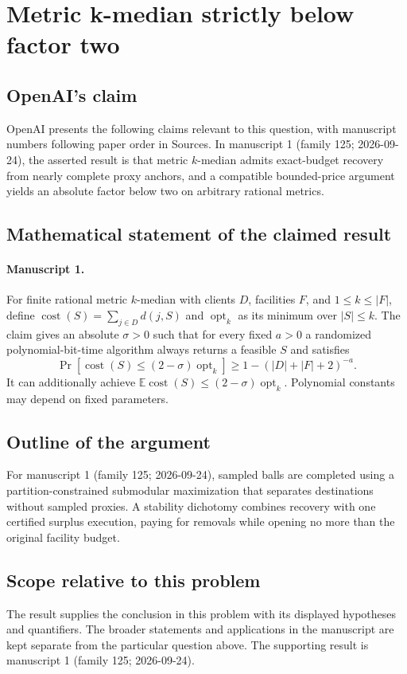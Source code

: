 \documentclass[11pt]{article}
\begin{document}
\section*{Metric k-median strictly below factor two}

\subsection{OpenAI's claim}
OpenAI presents the following claims relevant to this question, with manuscript numbers following paper order in Sources. In manuscript 1 (family 125; 2026-09-24), the asserted result is that metric $k$-median admits exact-budget recovery from nearly complete proxy anchors, and a compatible bounded-price argument yields an absolute factor below two on arbitrary rational metrics.

\subsection{Mathematical statement of the claimed result}
\paragraph{Manuscript 1.}
For finite rational metric $k$-median with clients $D$, facilities $F$, and $1\le k\le|F|$, define $\operatorname{cost}(S)=\sum_{j\in D}d(j,S)$ and $\operatorname{opt}_k$ as its minimum over $|S|\le k$. The claim gives an absolute $\sigma>0$ such that for every fixed $a>0$ a randomized polynomial-bit-time algorithm always returns a feasible $S$ and satisfies
\[
 \Pr[\operatorname{cost}(S)\le(2-\sigma)\operatorname{opt}_k]
 \ge1-(|D|+|F|+2)^{-a}.
\]
It can additionally achieve $\mathbb E\operatorname{cost}(S)\le(2-\sigma)\operatorname{opt}_k$. Polynomial constants may depend on fixed parameters.

\subsection{Outline of the argument}
For manuscript 1 (family 125; 2026-09-24), sampled balls are completed using a partition-constrained submodular maximization that separates destinations without sampled proxies. A stability dichotomy combines recovery with one certified surplus execution, paying for removals while opening no more than the original facility budget.

\subsection{Scope relative to this problem}
The result supplies the conclusion in this problem with its displayed hypotheses and quantifiers. The broader statements and applications in the manuscript are kept separate from the particular question above. The supporting result is manuscript 1 (family 125; 2026-09-24).
\end{document}
